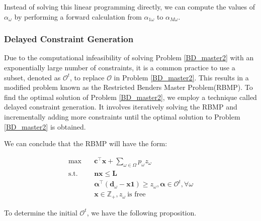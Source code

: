 
Instead of solving this linear programming directly, we can compute the values of $\alpha_{\omega}$ by performing a forward calculation from $\alpha_{1\omega}$ to $\alpha_{M\omega}$.

\subsubsection{Delayed Constraint Generation}\label{bender_stage}

Due to the computational infeasibility of solving Problem \eqref{BD_master2} with an exponentially large number of constraints, it is a common practice to use a subset, denoted as $\mathcal{O}^t$, to replace $\mathcal{O}$ in Problem \eqref{BD_master2}. This results in a modified problem known as the Restricted Benders Master Problem(RBMP). To find the optimal solution of Problem \eqref{BD_master2}, we employ a technique called delayed constraint generation. It involves iteratively solving the RBMP and incrementally adding more constraints until the optimal solution to Problem \eqref{BD_master2} is obtained.


We can conclude that the RBMP will have the form:

\begin{equation}\label{BD_master3}
  \begin{aligned}
    \max \quad & \mathbf{c}^{\intercal} \mathbf{x} + \sum_{\omega \in \Omega} p_{\omega} z_{\omega} \\
    \text {s.t.} \quad & \mathbf{n} \mathbf{x} \leq \mathbf{L} \\
    & \bm{\alpha}^{\intercal}(\mathbf{d}_{\omega}- \mathbf{x} \mathbf{1}) \geq z_{\omega}, \bm{\alpha} \in \mathcal{O}^{t}, \forall \omega \\
     & \mathbf{x} \in \mathbb{Z}_{+}, z_{\omega} ~\text{is free}
  \end{aligned}
\end{equation}

To determine the initial $\mathcal{O}^{t}$, we have the following proposition.


